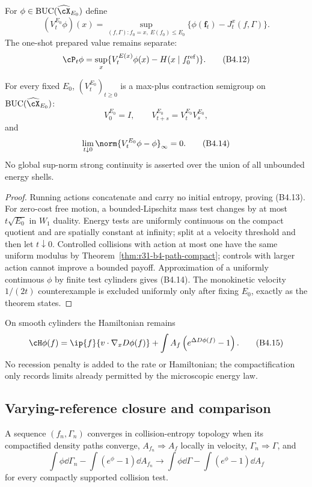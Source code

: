 For $\phi\in\operatorname{BUC}(\widehat\cX_{E_0})$ define
\[
 (V_t^{E_0}\phi)(x)=
 \sup_{(f,\Gamma):f_0=x,\ E(f_0)\le E_0}
 \{\phi(\mathbf f_t)-J_t^x(f,\Gamma)\}.                  \tag{B4.11}
\]
The one-shot prepared value remains separate:
\[
 \cP_t\phi=
 \sup_x\{V_t^{E(x)}\phi(x)-H(x\mid f_0^{\rm ref})\}.     \tag{B4.12}
\]

\begin{theorem}
\label{thm:r31-b4-semigroup}
For every fixed $E_0$, $(V_t^{E_0})_{t\ge0}$ is a max-plus contraction
semigroup on $\operatorname{BUC}(\widehat\cX_{E_0})$:
\[
 V_0^{E_0}=I,\qquad V_{t+s}^{E_0}=V_t^{E_0}V_s^{E_0},      \tag{B4.13}
\]
and
\[
 \lim_{t\downarrow0}\norm{V_t^{E_0}\phi-\phi}_\infty=0. \tag{B4.14}
\]
No global sup-norm strong continuity is asserted over the union of all
unbounded energy shells.
\end{theorem}

\begin{proof}
Running actions concatenate and carry no initial entropy, proving (B4.13).
For zero-cost free motion, a bounded-Lipschitz mass test changes by at most
$t\sqrt{E_0}$ in $W_1$ duality.  Energy tests are uniformly continuous on the
compact quotient and are spatially constant at infinity; split at a velocity
threshold and then let $t\downarrow0$.  Controlled collisions with action at
most one have the same uniform modulus by
Theorem~\ref{thm:r31-b4-path-compact}; controls with larger action cannot
improve a bounded payoff.  Approximation of a uniformly continuous $\phi$ by
finite test cylinders gives (B4.14).  The monokinetic velocity $1/(2t)$
counterexample is excluded uniformly only after fixing $E_0$, exactly as the
theorem states.
\end{proof}

On smooth cylinders the Hamiltonian remains
\[
 \cH\phi(f)=\ip{f}{v\cdot\nabla_xD\phi(f)}
 +\int A_f\left(e^{\Delta D\phi(f)}-1\right).             \tag{B4.15}
\]
No recession penalty is added to the rate or Hamiltonian; the compactification
only records limits already permitted by the microscopic energy law.

\subsection{Varying-reference closure and comparison}

A sequence $(f_n,\Gamma_n)$ converges in collision-entropy topology when its
compactified density paths converge, $A_{f_n}\Rightarrow A_f$ locally in
velocity, $\Gamma_n\Rightarrow\Gamma$, and
\[
 \int\phi\dd\Gamma_n-
 \int(e^\phi-1)\dd A_{f_n}
 \longrightarrow
 \int\phi\dd\Gamma-
 \int(e^\phi-1)\dd A_f                                  \tag{B4.16}
\]
for every compactly supported collision test.


